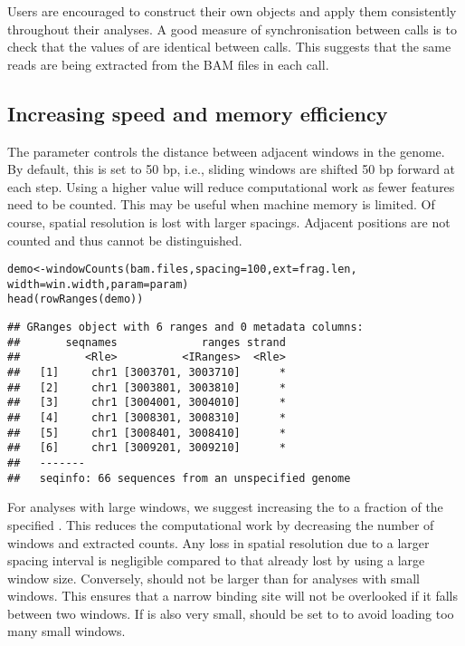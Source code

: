 \documentclass{report}\usepackage[]{graphicx}\usepackage[usenames,dvipsnames]{color}
\newcommand{\hlnum}[1]{\textcolor[rgb]{0.816,0.125,0.439}{#1}}%
\newcommand{\hlstd}[1]{\textcolor[rgb]{0.251,0.251,0.251}{#1}}%
\newcommand{\hlkwb}[1]{\textcolor[rgb]{0,0,0}{#1}}%
\newcommand{\hlkwc}[1]{\textcolor[rgb]{0.251,0.251,0.251}{#1}}%
\newcommand{\hlkwd}[1]{\textcolor[rgb]{0.878,0.439,0.125}{#1}}%
\newenvironment{knitrout}{}{} %
\begin{document}
Users are encouraged to construct their own  objects and apply them consistently throughout their analyses.
A good measure of synchronisation between  calls is to check that the values of  are identical between calls. 
This suggests that the same reads are being extracted from the BAM files in each call. 

\subsection{Increasing speed and memory efficiency}
\label{sec:efficiency}
The  parameter controls the distance between adjacent windows in the genome.
By default, this is set to 50 bp, i.e., sliding windows are shifted 50 bp forward at each step.
Using a higher value will reduce computational work as fewer features need to be counted.
This may be useful when machine memory is limited. 
Of course, spatial resolution is lost with larger spacings.
Adjacent positions are not counted and thus cannot be distinguished. 

\begin{knitrout}
\color{fgcolor}\begin{kframe}
\begin{alltt}
\hlstd{demo} \hlkwb{<-} \hlkwd{windowCounts}\hlstd{(bam.files,} \hlkwc{spacing}\hlstd{=}\hlnum{100}\hlstd{,} \hlkwc{ext}\hlstd{=frag.len,}
                     \hlkwc{width}\hlstd{=win.width,} \hlkwc{param}\hlstd{=param)}
\hlkwd{head}\hlstd{(}\hlkwd{rowRanges}\hlstd{(demo))}
\end{alltt}
\begin{verbatim}
## GRanges object with 6 ranges and 0 metadata columns:
##       seqnames             ranges strand
##          <Rle>          <IRanges>  <Rle>
##   [1]     chr1 [3003701, 3003710]      *
##   [2]     chr1 [3003801, 3003810]      *
##   [3]     chr1 [3004001, 3004010]      *
##   [4]     chr1 [3008301, 3008310]      *
##   [5]     chr1 [3008401, 3008410]      *
##   [6]     chr1 [3009201, 3009210]      *
##   -------
##   seqinfo: 66 sequences from an unspecified genome
\end{verbatim}
\end{kframe}
\end{knitrout}

For analyses with large windows, we suggest increasing the  to a fraction of the specified . 
This reduces the computational work by decreasing the number of windows and extracted counts. 
Any loss in spatial resolution due to a larger spacing interval is negligible compared to that already lost by using a large window size. 
Conversely,  should not be larger than  for analyses with small windows.
This ensures that a narrow binding site will not be overlooked if it falls between two windows.
If  is also very small,  should be set to  to avoid loading too many small windows.
\end{document}
